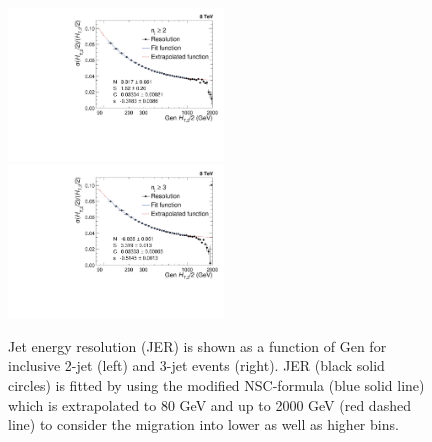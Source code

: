 \begin{figure}[!h]
 \begin{center}
 \hspace*{-5mm}\includegraphics[width=0.51\textwidth]{Plots_HT_2_150/Extrapolate_Sigma_Value_Res_2_crystal_range_ext.pdf}%
 ~~\includegraphics[width=0.51\textwidth]{Plots_HT_2_150/Extrapolate_Sigma_Value_Res_3_crystal_ext.pdf}
 \caption{Jet energy resolution (JER) is shown as a function of Gen \httwo for inclusive 2-jet (left) and 3-jet events (right). JER (black solid circles) is fitted by using the modified NSC-formula (blue solid line) which is extrapolated to 80 GeV and up to 2000 GeV (red dashed line) to consider the migration into lower as well as higher bins.}
 \label{fig:resolution}
 \end{center}
\end{figure}
 
